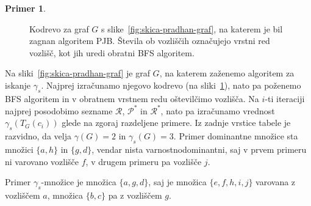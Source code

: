 \documentclass[12pt,a4paper,twoside]{article}
\theoremstyle{definition} %
\newtheorem{primer}[definicija]{Primer}
\theoremstyle{plain} %
\numberwithin{equation}{section}  %
\begin{document}
\begin{primer}
\begin{figure}[h!]
\caption{Kodrevo za graf $G$ s slike~\ref{fig:skica-pradhan-graf}, na katerem je bil zagnan algoritem PJB. Števila ob vozliščih označujejo vrstni red vozlišč, kot jih uredi obratni BFS algoritem.}  \label{skica pradhan}
\end{figure}
Na sliki~\ref{fig:skica-pradhan-graf} je graf $G$, na katerem zaženemo algoritem za iskanje $\gamma_s$. Najprej izračunamo njegovo kodrevo (na sliki~\ref{skica pradhan}), nato pa poženemo BFS algoritem in v obratnem vrstnem redu oštevilčimo vozlišča. Na $i$-ti iteraciji najprej posodobimo sezname $\mathcal{R}$, $\mathcal{P}^*$ in $\mathcal{R}^*$, nato pa izračunamo vrednost $\gamma_s(T_G(c_i))$ glede na zgoraj razdeljene primere. Iz zadnje vrstice tabele je razvidno, da velja $\gamma(G)=2$ in $\gamma_s(G)=3$. Primer dominantne množice sta množici $\{a,  h\}$ in  $\{g,d\}$, vendar nista varnostnodominantni, saj v prvem primeru ni varovano vozlišče $f$, v drugem primeru pa vozlišče $j$.

Primer $\gamma_s$-množice je množica $\{a, g, d\}$, saj je množica $\{e, f, h, i, j\}$ varovana z vozliščem $a$, množica $\{b, c\}$ pa z vozliščem $g$.  
\end{primer}
\end{document}
